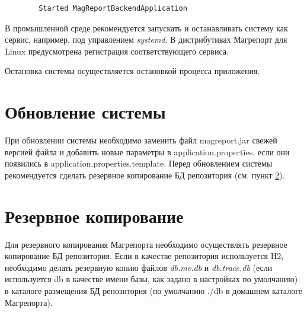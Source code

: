 \documentclass[../user-manual.tex]{subfiles}
\begin{document}
	\begin{lstlisting}
		Started MagReportBackendApplication
	\end{lstlisting}

	В промышленной среде рекомендуется запускать и останавливать систему как сервис, например, под управлением \textit{systemd}. В дистрибутивах Магрепорт для Linux предусмотрена регистрация соответствующего сервиса.
	
	Остановка системы осуществляется остановкой процесса приложения.
	
	\section{Обновление системы}\label{section:upgrade}
	
	При обновлении системы необходимо заменить файл magreport.jar свежей версией файла и добавить новые параметры в application.properties, если они появились в application.properties.template. Перед обновлением системы рекомендуется сделать резервное копирование БД репозитория (см. пункт \ref{section:backup}).
	
	\section{Резервное копирование}\label{section:backup}
	
	Для резервного копирования Магрепорта необходимо осуществлять резервное копирование БД репозитория. Если в качестве репозитория используется H2, необходимо делать резервную копию файлов \textit{db.mv.db} и \textit{db.trace.db} (если используется db в качестве имени базы, как задано в настройках по умолчанию) в каталоге размещения БД репозитория (по умолчанию ./db в домашнем каталоге Магрепорта).
	
\end{document}
